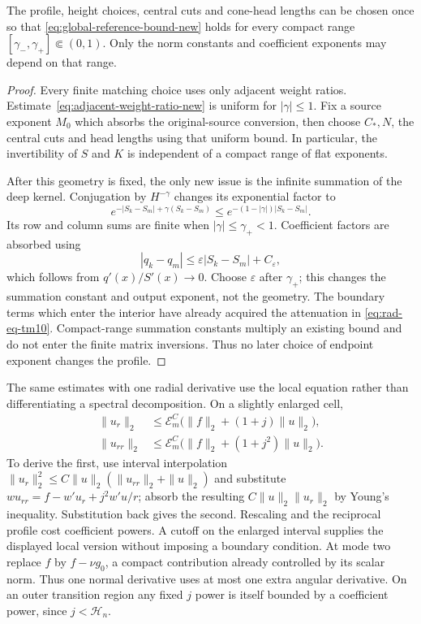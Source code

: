 \begin{lemma}
\label{lem:radial-uniform-exponents}
The profile, height choices, central cuts and cone-head lengths can be
chosen once so that \eqref{eq:global-reference-bound-new} holds for every
compact range $[\gamma_-,\gamma_+]\Subset(0,1)$.  Only the norm
constants and coefficient exponents may depend on that range.
\end{lemma}
\begin{proof}
Every finite matching choice uses only adjacent weight ratios.
Estimate~\eqref{eq:adjacent-weight-ratio-new} is uniform for
$|\gamma|\le1$.  Fix a source exponent $M_0$ which absorbs the
original-source conversion, then choose $C_*,N$, the central cuts
and head lengths using that uniform bound.  In particular, the
invertibility of $S$ and $K$ is independent of a compact range of
flat exponents.

After this geometry is fixed, the only new issue is the infinite
summation of the deep kernel.  Conjugation by $H^{-\gamma}$ changes
its exponential factor to
\[
 e^{-|S_k-S_m|+\gamma(S_k-S_m)}
      \le e^{-(1-|\gamma|)|S_k-S_m|}.
\]
Its row and column sums are finite when $|\gamma|\le\gamma_+<1$.
Coefficient factors are absorbed using
\[
 |q_k-q_m|\le\varepsilon|S_k-S_m|+C_\varepsilon,
\]
which follows from $q'(x)/S'(x)\to0$.
Choose $\varepsilon$ after $\gamma_+$; this changes the summation
constant and output exponent, not the geometry.  The boundary terms
which enter the interior have already acquired the attenuation in
\eqref{eq:rad-eq-tm10}.  Compact-range summation constants multiply an
existing bound and do not enter the finite matrix inversions.
Thus no later choice of endpoint exponent changes the profile.
\end{proof}

The same estimates with one radial derivative use the local equation
rather than differentiating a spectral decomposition.  On a slightly
enlarged cell,
\begin{equation}\label{eq:rad-eq-rm39}
 \begin{aligned}
 \|u_r\|_2&\le\mathcal E_m^C\bigl(\|f\|_2+(1+j)\|u\|_2\bigr),\\
 \|u_{rr}\|_2&\le\mathcal E_m^C\bigl(\|f\|_2+(1+j^2)\|u\|_2\bigr).
 \end{aligned}
\end{equation}
To derive the first, use interval interpolation
$\|u_r\|_2^2\le C\|u\|_2(\|u_{rr}\|_2+\|u\|_2)$ and substitute
$wu_{rr}=f-w'u_r+j^2w'u/r$; absorb the resulting
$C\|u\|_2\|u_r\|_2$ by Young's inequality.  Substitution back gives
the second.  Rescaling and the reciprocal profile cost coefficient
powers.  A cutoff on the enlarged interval supplies the displayed
local version without imposing a boundary condition.  At mode two
replace $f$ by $f-\nu g_0$, a compact contribution already controlled
by its scalar norm.
Thus one normal derivative uses at most one extra angular derivative.
On an outer transition region any fixed $j$ power is itself bounded
by a coefficient power, since $j<\mathcal H_n$.

